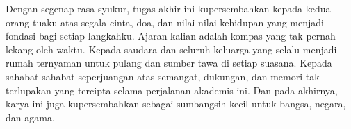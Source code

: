 \vspace{7cm}

\begin{center}
	Dengan segenap rasa syukur, tugas akhir ini kupersembahkan kepada kedua orang tuaku atas segala cinta, doa, dan nilai-nilai kehidupan yang menjadi fondasi bagi setiap langkahku.
	Ajaran kalian adalah kompas yang tak pernah lekang oleh waktu.
	Kepada saudara dan seluruh keluarga yang selalu menjadi rumah ternyaman untuk pulang dan sumber tawa di setiap suasana.
	Kepada sahabat-sahabat seperjuangan atas semangat, dukungan, dan memori tak terlupakan yang tercipta selama perjalanan akademis ini.
	Dan pada akhirnya, karya ini juga kupersembahkan sebagai sumbangsih kecil untuk bangsa, negara, dan agama.
\end{center}

